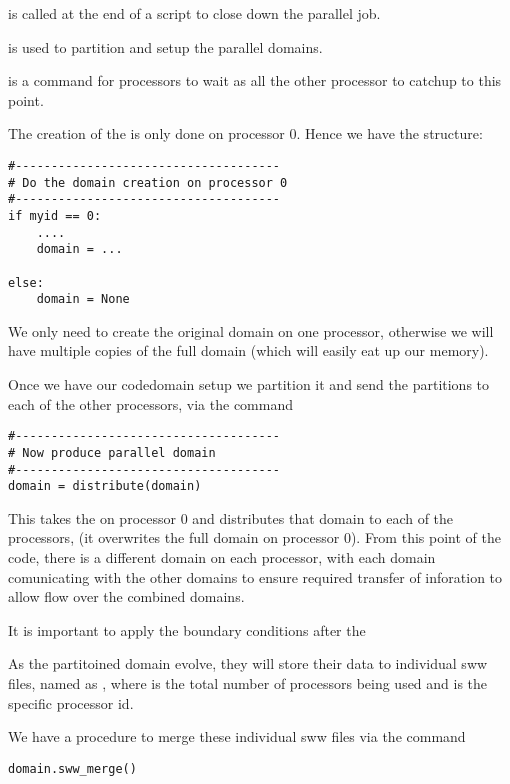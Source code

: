 \documentclass{manual}
\begin{document}
 is called at the end of a script to close down the parallel job.

 is used to partition and setup the parallel domains.

 is a command for processors to wait as all the other processor to catchup to this point.




The creation of the  is only done on processor 0. Hence we have the structure:

\begin{verbatim}
#-------------------------------------
# Do the domain creation on processor 0
#-------------------------------------
if myid == 0:
    ....
    domain = ...

else:
    domain = None
\end{verbatim}

We only need to create the original domain on one processor, otherwise we will have multiple copies of the full domain (which will easily eat up our memory).

Once we have our code{domain} setup we partition it and send the partitions to each of the other processors, via the command

\begin{verbatim}
#-------------------------------------
# Now produce parallel domain
#-------------------------------------
domain = distribute(domain)
\end{verbatim}

This takes the  on processor 0 and distributes that domain to each of the processors, (it overwrites the full domain on processor 0).  From this point of the code, there is a different domain on each processor, with each domain comunicating with the other domains to ensure required transfer of inforation to allow flow over the combined domains.

It is important to apply the boundary conditions after the 



As the partitoined domain evolve, they will store their data to individual sww files, named as , where  is the total number of processors being used and  is the specific processor id.

We have a procedure to merge these individual sww files via the command

\begin{verbatim}
domain.sww_merge()
\end{verbatim}
\end{document}
